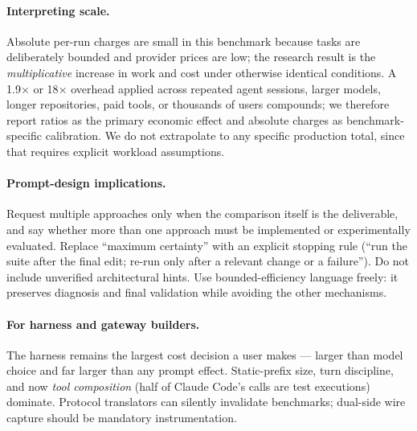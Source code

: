 \documentclass[11pt]{article}
\newcommand{\cc}{Claude Code}
\newcommand{\xd}{$\times$}
\begin{document}
\paragraph{Interpreting scale.} Absolute per-run charges are small in
this benchmark because tasks are deliberately bounded and provider prices
are low; the research result is the \emph{multiplicative} increase in work
and cost under otherwise identical conditions. A 1.9\xd{} or 18\xd{}
overhead applied across repeated agent sessions, larger models, longer
repositories, paid tools, or thousands of users compounds; we therefore
report ratios as the primary economic effect and absolute charges as
benchmark-specific calibration. We do not extrapolate to any specific
production total, since that requires explicit workload assumptions.

\paragraph{Prompt-design implications.} Request multiple approaches only
when the comparison itself is the deliverable, and say whether more than
one approach must be implemented or experimentally evaluated. Replace
``maximum certainty'' with an explicit stopping rule (``run the suite
after the final edit; re-run only after a relevant change or a
failure''). Do not include unverified architectural hints. Use
bounded-efficiency language freely: it preserves diagnosis and final
validation while avoiding the other mechanisms.

\paragraph{For harness and gateway builders.} The harness remains the
largest cost decision a user makes --- larger than model choice and far
larger than any prompt effect. Static-prefix size, turn discipline, and
now \emph{tool composition} (half of \cc{}'s calls are test executions)
dominate. Protocol translators can silently invalidate benchmarks;
dual-side wire capture should be mandatory instrumentation.
\end{document}
